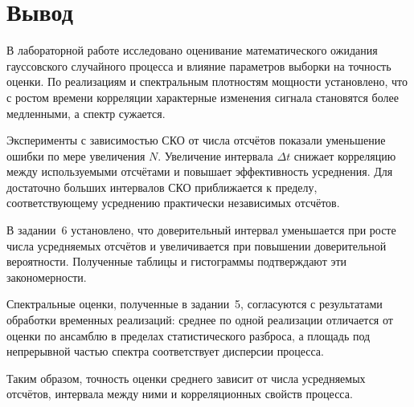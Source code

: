 \section{Вывод}

В лабораторной работе исследовано оценивание математического ожидания гауссовского случайного процесса и влияние параметров выборки на точность оценки. По реализациям и спектральным плотностям мощности установлено, что с ростом времени корреляции характерные изменения сигнала становятся более медленными, а спектр сужается.

Эксперименты с зависимостью СКО от числа отсчётов показали уменьшение ошибки по мере увеличения $N$. Увеличение интервала $\Delta t$ снижает корреляцию между используемыми отсчётами и повышает эффективность усреднения. Для достаточно больших интервалов СКО приближается к пределу, соответствующему усреднению практически независимых отсчётов.

В задании~6 установлено, что доверительный интервал уменьшается при росте числа усредняемых отсчётов и увеличивается при повышении доверительной вероятности. Полученные таблицы и гистограммы подтверждают эти закономерности.

Спектральные оценки, полученные в задании~5, согласуются с результатами обработки временных реализаций: среднее по одной реализации отличается от оценки по ансамблю в пределах статистического разброса, а площадь под непрерывной частью спектра соответствует дисперсии процесса.

Таким образом, точность оценки среднего зависит от числа усредняемых отсчётов, интервала между ними и корреляционных свойств процесса.
